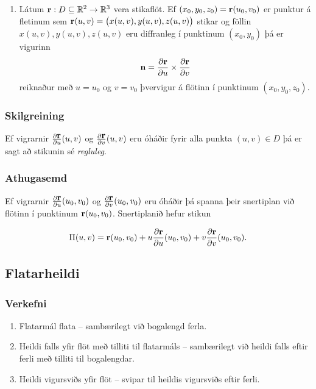 \begin{enumerate}
    \item 
  Látum $\mbox{${\bf r}$}: D\subseteq {\mathbb R}^2\rightarrow {\mathbb R}^3$ vera stikaflöt.  
Ef $(x_0, y_0, z_0)=\mbox{${\bf r}$}(u_0, v_0)$ er punktur á fletinum sem 
$\mbox{${\bf r}$}(u,v)=\big(x(u,v), y(u,v), z(u,v)\big)$ stikar og
föllin $x(u,v), y(u,v), z(u,v)$ eru diffranleg í punktinum $(x_0,
y_0)$ þá er vigurinn
     $$\mbox{${\bf n}$} =\frac{\partial \mbox{${\bf r}$}}{\partial u}\times 
\frac{\partial \mbox{${\bf r}$}}{\partial v}$$
reiknaður með $u=u_0$ og $v=v_0$ þvervigur á flötinn í punktinum 
$(x_0, y_0, z_0)$.
\end{enumerate}
 


\subsubsection{Skilgreining  \rtask{}}
Ef vigrarnir $\frac{\partial \mbox{${\bf r}$}}{\partial u}(u,v)$ og $\frac{\partial \mbox{${\bf r}$}}{\partial v}(u,v)$ eru óháðir
fyrir alla punkta $(u,v)\in D$ þá er sagt að stikunin sé {\em
  regluleg}. 

 

\subsubsection{Athugasemd \rtask{}}
Ef vigrarnir  
$\frac{\partial \mbox{${\bf r}$}}{\partial u}(u_0,v_0)$ og $\frac{\partial\mbox{${\bf r}$}}{\partial v}(u_0,v_0)$ eru óháðir þá spanna þeir snertiplan við
flötinn í punktinum $\mbox{${\bf r}$}(u_0,v_0)$. Snertiplanið hefur stikun 

$$\Pi(u,v) = \mbox{${\bf r}$}(u_0,v_0)+u\frac{\partial \mbox{${\bf r}$}}{\partial u}(u_0,v_0)
+v\frac{\partial \mbox{${\bf r}$}}{\partial v}(u_0,v_0).$$






\subsection{Flatarheildi} 

\subsubsection{Verkefni  \rtask{}}
\begin {enumerate}
 \item Flatarmál flata -- sambærilegt við bogalengd ferla.  
\item Heildi falls yfir flöt með tilliti til flatarmáls -- sambærilegt við heildi falls eftir ferli með tilliti til bogalengdar.
\item Heildi vigursviðs yfir flöt -- svipar til heildis vigursviðs eftir ferli. 
 \end {enumerate}









